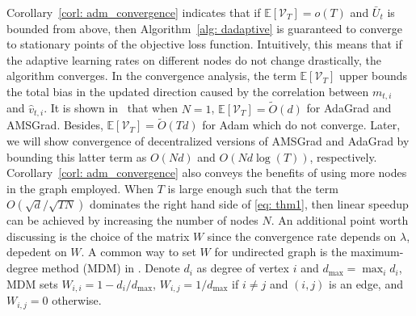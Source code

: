 \documentclass[anon,12pt]{colt2021} %
\begin{document}
Corollary~\ref{corl: adm_convergence} indicates that if  $  \mathbb E [\mathcal{V}_T  ]  = o(T)$ and $\bar U_t$ is bounded from above, then Algorithm~\ref{alg: dadaptive} is guaranteed to converge to stationary points of the objective loss function. 
Intuitively, this means that if the adaptive learning rates on different nodes do not change drastically, the algorithm converges. 
In the convergence analysis, the term $\mathbb E [\mathcal{V}_T]$ upper bounds the total bias in the updated direction caused by the correlation between $m_{t,i}$ and $\hat v_{t,i}$.
It is shown in~\cite{chen2018convergence} that when $N=1$, $\mathbb E [\mathcal{V}_T]=\tilde O (d) $ for AdaGrad and AMSGrad. Besides, $\mathbb E [\mathcal{V}_T  ]  = \tilde O (Td) $ for Adam which do not converge.  {Later, we will show convergence of decentralized versions of AMSGrad and AdaGrad by bounding this latter term as $O(Nd)$ and $O(Nd \log (T))$, respectively.}
Corollary~\ref{corl:  adm_convergence} also conveys the benefits of using more nodes in the graph employed. 
When $T$ is large enough such that the term $O(\sqrt{d}/\sqrt{TN})$ dominates the right hand side of \eqref{eq: thm1}, then linear speedup can be achieved by increasing the number of nodes $N$.   
An additional point worth discussing is the choice of the matrix $W$ since the convergence rate depends on $\lambda$, depedent on $W$. A common way to set $W$ for undirected graph is the maximum-degree method (MDM) in \cite{boyd2004fastest}. Denote $d_i$ as degree of vertex $i$ and $d_{\max} = \max_i d_i$, MDM sets $W_{i,i} = 1-d_i/d_{\max}$, $W_{i,j} = 1/d_{\max}$ if $i\neq j$ and $(i,j)$ is an edge,  and $W_{i,j} = 0$ otherwise. 
\end{document}
